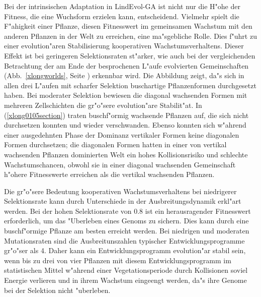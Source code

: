 Bei der intrinsischen Adaptation in LindEvol-GA ist nicht nur die H"ohe der Fitness, die eine Wuchsform
erzielen kann, entscheidend. Vielmehr spielt die F"ahigkeit einer Pflanze, diesen Fitnesswert im gemeinsamen Wachstum
mit den anderen Pflanzen in der Welt zu erreichen, eine ma"sgebliche Rolle. Dies f"uhrt zu einer evolution"aren
Stabilisierung kooperativen Wachstumsverhaltens. Dieser Effekt ist bei geringeren Selektionsraten st"arker,
wie auch bei der vergleichenden Betrachtung der am Ende der besprochenen L"aufe evolvierten Gemeinschaften
(Abb.\ \ref{xlongworlds}, Seite \pageref{xlongworlds}) erkennbar wird. Die Abbildung zeigt, da"s sich in allen drei L"aufen mit scharfer
Selektion buschartige Pflanzenformen durchgesetzt haben. Bei moderater Selektion bewiesen die diagonal
wachsenden Formen mit mehreren Zellschichten die gr"o"sere evolution"are Stabilit"at. In 
(\ref{xlong0105section}) traten buschf"ormig wachsende Pflanzen auf, die sich nicht durchsetzen konnten
und wieder verschwanden. Ebenso konnten sich w"ahrend einer ausgedehnten Phase der Dominanz vertikaler
Formen keine diagonalen Formen durchsetzen; die diagonalen Formen hatten in einer von vertikal wachsenden
Pflanzen dominierten Welt ein hohes Kollisionsrisiko und schlechte Wachstumschancen, obwohl sie in einer
diagonal wachsenden Gemeinschaft h"ohere Fitnesswerte erreichen als die vertikal wachsenden Pflanzen.

Die gr"o"sere Bedeutung kooperativen Wachstumsverhaltens bei niedrigerer Selektionsrate kann durch 
Unterschiede in der Ausbreitungsdynamik erkl"art werden. Bei der hohen Selektionsrate von 0.8 ist 
ein herausragender Fitnesswert erforderlich, um das "Uberleben eines Genoms zu sichern. Dies kann durch
eine buschf"ormige Pflanze am besten erreicht werden. Bei niedrigen und moderaten Mutationsraten
sind die Ausbreitunszahlen typischer Entwicklungsprogramme gr"o"ser als 4. Daher kann ein Entwicklungsprogramm
evolution"ar stabil sein, wenn bis zu
drei von vier Pflanzen mit diesem Entwicklungsprogramm im statistischen Mittel w"ahrend einer
Vegetationsperiode durch Kollisionen soviel Energie verlieren und in ihrem Wachstum eingeengt
werden, da"s ihre Genome bei der Selektion nicht "uberleben.

